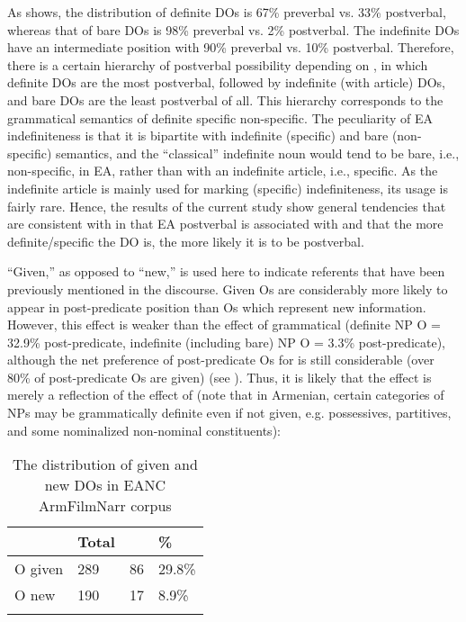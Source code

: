 \documentclass[output=paper,colorlinks,citecolor=brown,draftmode]{langscibook}
\begin{document}
As  shows, the distribution of definite DOs is 67\% preverbal vs. 33\% postverbal, whereas that of bare DOs is 98\% preverbal vs. 2\% postverbal. The indefinite DOs have an intermediate position with 90\% preverbal vs. 10\% postverbal. Therefore, there is a certain hierarchy of postverbal  possibility depending on , in which definite DOs are the most postverbal, followed by indefinite (with article) DOs, and bare DOs are the least postverbal of all. This hierarchy corresponds to the grammatical semantics of definite {\Rightarrow} specific {\Rightarrow} non-specific. The peculiarity of EA indefiniteness is that it is bipartite with indefinite (specific) and bare (non-specific) semantics, and the ``classical'' indefinite noun would tend to be bare, i.e., non-specific, in EA, rather than with an indefinite article, i.e., specific. As the indefinite article is mainly used for marking (specific) indefiniteness, its usage is fairly rare.
Hence, the results of the current study show general tendencies that are consistent with \citet{samvelian_persistence_2023} in that EA postverbal  is associated with  and that the more definite/specific the DO is, the more likely it is to be postverbal.


 ``Given,'' as opposed to ``new,'' is used here to indicate referents that have been previously mentioned in the discourse. Given Os are considerably more likely to appear in post-predicate position than Os which represent new information. However, this effect is weaker than the effect of grammatical  (definite NP O = 32.9\% post-predicate, indefinite (including bare) NP O = 3.3\% post-predicate), although the net preference of post-predicate Os for  is still considerable (over 80\% of post-predicate Os are given) (see ). Thus, it is likely that the  effect is merely a reflection of the effect of  (note that in Armenian, certain categories of NPs may be grammatically definite even if not given, e.g. possessives, partitives, and some nominalized non-nominal constituents):

\begin{table}
    \begin{tabularx}{.8\textwidth}{lYYY}
\lsptoprule
 & Total &  & \%  \\
\midrule
O given & 289 & 86 & 29.8\% \\
O new & 190 & 17 & 8.9\% \\
\lspbottomrule
    \end{tabularx}
    \caption{The distribution of given and new DOs in EANC ArmFilmNarr corpus}
    \label{Armenian:tab:5}
\end{table}
\end{document}

